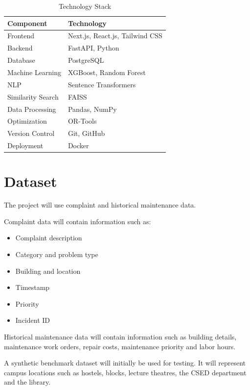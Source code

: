 \documentclass[12pt,a4paper]{article}
\begin{document}
\begin{table}[H]
\centering
\renewcommand{\arraystretch}{1.3}

\begin{tabular}{p{} p{}}
\toprule
\textbf{Component} & \textbf{Technology} \\
\midrule
Frontend & Next.js, React.js, Tailwind CSS \\
Backend & FastAPI, Python \\
Database & PostgreSQL \\
Machine Learning & XGBoost, Random Forest \\
NLP & Sentence Transformers \\
Similarity Search & FAISS \\
Data Processing & Pandas, NumPy \\
Optimization & OR-Tools \\
Version Control & Git, GitHub \\
Deployment & Docker \\
\bottomrule
\end{tabular}

\caption{Technology Stack}

\end{table}



\section{Dataset}

The project will use complaint and historical maintenance data.

Complaint data will contain information such as:

\begin{itemize}
    \item Complaint description
    \item Category and problem type
    \item Building and location
    \item Timestamp
    \item Priority
    \item Incident ID
\end{itemize}

Historical maintenance data will contain information such as building details, maintenance work orders, repair costs, maintenance priority and labor hours.

A synthetic benchmark dataset will initially be used for testing. It will represent campus locations such as hostels, blocks, lecture theatres, the CSED department and the library.
\end{document}
